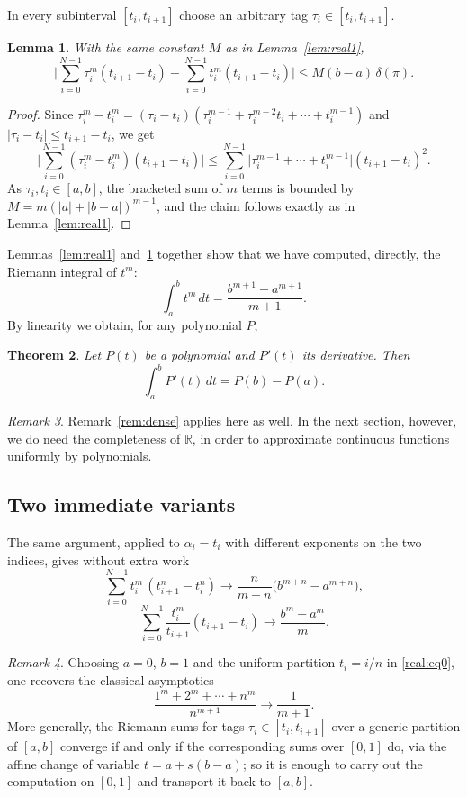 \documentclass[11pt,fleqn]{article}
\def\R{\mathbb R}
\theoremstyle{plain}
\newtheorem{thm}{Theorem}[section]
\newtheorem{lemma}[thm]{Lemma}
\theoremstyle{remark}
\newtheorem{remark}[thm]{Remark}
\begin{document}
In every subinterval $[t_i,t_{i+1}]$ choose an arbitrary tag
$\tau_i\in[t_i,t_{i+1}]$.

\begin{lemma}\label{lem:real2}
With the same constant $M$ as in Lemma~\ref{lem:real1},
\[
\Big|\sum_{i=0}^{N-1}\tau_i^m(t_{i+1}-t_i)-\sum_{i=0}^{N-1}t_i^m(t_{i+1}-t_i)\Big|
\le M(b-a)\,\delta(\pi).
\]
\end{lemma}
\begin{proof}
Since $\tau_i^m-t_i^m=(\tau_i-t_i)(\tau_i^{m-1}+\tau_i^{m-2}t_i+\cdots+t_i^{m-1})$
and $|\tau_i-t_i|\le t_{i+1}-t_i$, we get
\[
\Big|\sum_{i=0}^{N-1}(\tau_i^m-t_i^m)(t_{i+1}-t_i)\Big|
\le\sum_{i=0}^{N-1}\big|\tau_i^{m-1}+\cdots+t_i^{m-1}\big|(t_{i+1}-t_i)^2.
\]
As $\tau_i,t_i\in[a,b]$, the bracketed sum of $m$ terms is bounded by
$M=m(|a|+|b-a|)^{m-1}$, and the claim follows exactly as in
Lemma~\ref{lem:real1}.
\end{proof}

Lemmas~\ref{lem:real1} and~\ref{lem:real2} together show that we have
computed, directly, the Riemann integral of $t^m$:
\begin{equation}\label{real:eq0}
\int_a^b t^m\,dt=\frac{b^{m+1}-a^{m+1}}{m+1}.
\end{equation}
By linearity we obtain, for any polynomial $P$,
\begin{thm}\label{thm:real}
Let $P(t)$ be a polynomial and $P'(t)$ its derivative. Then
\[
\int_a^b P'(t)\,dt=P(b)-P(a).
\]
\end{thm}

\begin{remark}
Remark~\ref{rem:dense} applies here as well. In the next section, however,
we do need the completeness of $\R$, in order to approximate continuous
functions uniformly by polynomials.
\end{remark}

\subsection{Two immediate variants}

The same argument, applied to $\alpha_i=t_i$ with different exponents on
the two indices, gives without extra work
\[
\sum_{i=0}^{N-1}t_i^m\,(t_{i+1}^n-t_i^n)\longrightarrow
\frac{n}{m+n}\big(b^{m+n}-a^{m+n}\big),
\]
\[
\sum_{i=0}^{N-1}\frac{t_i^m}{t_{i+1}}(t_{i+1}-t_i)\longrightarrow
\frac{b^m-a^m}{m}.
\]

\begin{remark}
Choosing $a=0$, $b=1$ and the uniform partition $t_i=i/n$ in
\eqref{real:eq0}, one recovers the classical asymptotics
\[
\frac{1^m+2^m+\cdots+n^m}{n^{m+1}}\longrightarrow\frac1{m+1}.
\]
More generally, the Riemann sums for tags $\tau_i\in[t_i,t_{i+1}]$ over a
generic partition of $[a,b]$ converge if and only if the corresponding
sums over $[0,1]$ do, via the affine change of variable $t=a+s(b-a)$; so
it is enough to carry out the computation on $[0,1]$ and transport it back
to $[a,b]$.
\end{remark}
\end{document}
